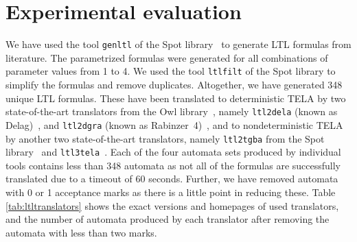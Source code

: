 \documentclass[runningheads]{llncs}
\def\false{\mathit{false}}
\def\true{\mathit{true}}
\begin{document}




\section{Experimental evaluation}\label{sec:experiments}

We have used the tool \texttt{genltl} of the Spot
library~\cite{duret.16.atva2} to generate LTL formulas from
literature. The parametrized formulas were generated for all
combinations of parameter values from 1 to 4. We used the tool
\texttt{ltlfilt} of the Spot library to simplify the formulas and
remove duplicates. Altogether, we have generated 348 unique LTL
formulas. These have been translated to deterministic TELA by two
state-of-the-art translators from the Owl
library~\cite{kretinsky.18.atva}, namely \texttt{ltl2dela} (known as
Delag)~\cite{muller.17.gandalf}, and \texttt{ltl2dgra} (known as
Rabinzer~4)~\cite{kretinsky.18.cav}, and to nondeterministic TELA by
another two state-of-the-art translators, namely \texttt{ltl2tgba}
from the Spot library~\cite{duret.16.atva2} and
\texttt{ltl3tela}~\cite{major.19.atva}. Each of the four automata sets
produced by individual tools contains less than 348 automata as not
all of the formulas are successfully translated due to a timeout of 60
seconds. Further, we have removed automata with 0 or 1 acceptance
marks as there is a little point in reducing these. Table
\ref{tab:ltltranslators} shows the exact versions and homepages of
used translators, and the number of automata produced by each
translator after removing the automata with less than two marks.
\end{document}
